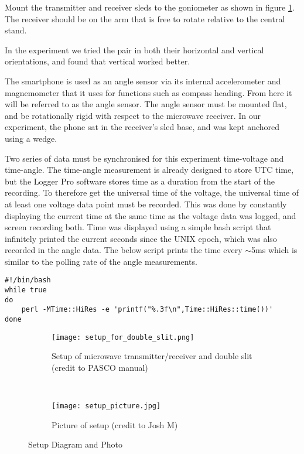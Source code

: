 Mount the transmitter and receiver sleds to the goniometer as shown in figure \ref{fig:goniometer_and_microwaves}. The receiver should be on the arm that is free to rotate relative to the central stand.

In the experiment we tried the pair in both their horizontal and vertical orientations, and found that vertical worked better.

The smartphone is used as an angle sensor via its internal accelerometer and magnemometer that it uses for functions such as compass heading. From here it will be referred to as the angle sensor. The angle sensor must be mounted flat, and be rotationally rigid with respect to the microwave receiver. In our experiment, the phone sat in the receiver's sled base, and was kept anchored using a wedge.

Two series of data must be synchronised for this experiment \textemdash time-voltage and time-angle. The time-angle measurement is already designed to store UTC time, but the Logger Pro software stores time as a duration from the start of the recording. To therefore get the universal time of the voltage, the universal time of at least one voltage data point must be recorded. This was done by constantly displaying the current time at the same time as the voltage data was logged, and screen recording both. Time was displayed using a simple bash script that infinitely printed the current seconds since the UNIX epoch, which was also recorded in the angle data. The below script prints the time every $\sim$5ms which is similar to the polling rate of the angle measurements.


\begin{verbatim}
#!/bin/bash
while true
do
    perl -MTime::HiRes -e 'printf("%.3f\n",Time::HiRes::time())'
done
\end{verbatim}

\begin{figure}[h]
\centering

\begin{subfigure}[t]{0.5\textwidth}
\texttt{[image: setup\_for\_double\_slit.png]}
\caption{Setup of microwave transmitter/receiver and double slit (credit to PASCO manual)}
\label{fig:goniometer_and_microwaves}

\end{subfigure}
~
\begin{subfigure}[t]{0.4\textwidth}
\texttt{[image: setup\_picture.jpg]}

\caption{Picture of setup (credit to Josh M)}
\label{pic:setup_photo}

\end{subfigure}

\caption{Setup Diagram and Photo}

\end{figure}

